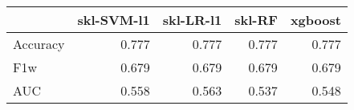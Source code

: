 \begin{tabular}{lrrrr}
\toprule
{} &  skl-SVM-l1 &  skl-LR-l1 &  skl-RF &  xgboost \\
\midrule
Accuracy &       0.777 &      0.777 &   0.777 &    0.777 \\
F1w      &       0.679 &      0.679 &   0.679 &    0.679 \\
AUC      &       0.558 &      0.563 &   0.537 &    0.548 \\
\bottomrule
\end{tabular}
